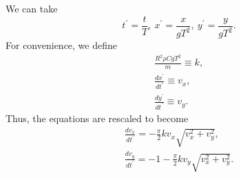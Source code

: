 \documentclass[11pt]{article}
\begin{document}
We can take 
\begin{equation}
    t^\prime = \frac{t}{T}, \ x^\prime = \frac{x}{gT^2}, \ y^\prime = \frac{y}{gT^2}.
\end{equation}
For convenience, we define
\begin{equation}
\begin{gathered}
    \frac{R^2 \rho C g T^2}{m} \equiv k, \\
    \frac{dx^\prime}{dt^\prime} \equiv v_x, \\
    \frac{dy^\prime}{dt^\prime} \equiv v_y.
\end{gathered}
\end{equation}
Thus, the equations are rescaled to become
\begin{equation}
\begin{gathered}
    \frac{dv_x}{dt^\prime} = -\frac{\pi}{2} k v_x \sqrt{v_x^2 + v_y^2}, \\
    \frac{dv_y}{dt^\prime} = -1 - \frac{\pi}{2} k v_y \sqrt{v_x^2 + v_y^2}.
\end{gathered}
\end{equation}
\end{document}
